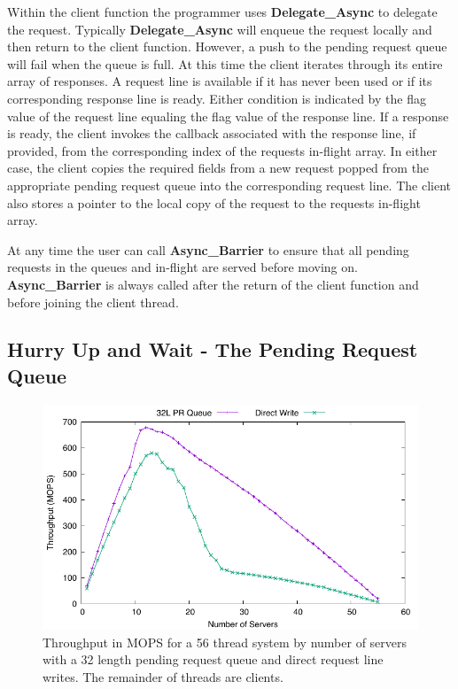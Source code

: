 \documentclass{uicthesi}
\begin{document}
Within the client function the programmer uses \textbf{Delegate\_Async} to delegate the request. Typically \textbf{Delegate\_Async} will enqueue the request locally and then return to the client function. However, a push to the pending request queue will fail when the queue is full. At this time the client iterates through its entire array of responses. A request line is available if it has never been used or if its corresponding response line is ready. Either condition is indicated by the flag value of the request line equaling the flag value of the response line. If a response is ready, the client invokes the callback associated with the response line, if provided, from the corresponding index of the requests in-flight array. In either case, the client copies the required fields from a new request popped from the appropriate pending request queue into the corresponding request line. The client also stores a pointer to the local copy of the request to the requests in-flight array. 

At any time the user can call \textbf{Async\_Barrier} to ensure that all pending requests in the queues and in-flight are served before moving on.  \textbf{Async\_Barrier} is always called after the return of the client function and before joining the client thread. 

\subsection{Hurry Up and Wait - The Pending Request Queue} \label{pr}
\begin{figure}[ht!]
\centering
\includegraphics[width=0.9\columnwidth]{FIG/queue_v_no_queue.pdf}
\caption{Throughput in MOPS for a 56 thread system by number of servers with a 32 length pending request queue and direct request line writes. The remainder of threads are clients.}
\label{fig:queue_v_no_queue}
\end{figure}
\end{document}
